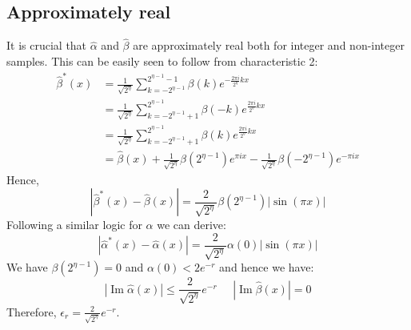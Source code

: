 \documentclass[aps,floatfix,10pt,amssymb,amsfont,amsmath,superscriptaddress,float,nofootinbib,longbibliography,nobalancelastpage,twocolumn]{revtex4-2}
\begin{document}
\subsection{Approximately real}
\label{section:approxiamtely_real}
\label{app:reality}
It is crucial that $\hat \alpha$ and $\hat \beta$ are approximately real both for integer and non-integer samples. This can be easily seen to follow from characteristic 2:
\begin{align}
    \hat\beta^*(x) &=\frac{1}{\sqrt{2^{\eta}}}\sum_{k=-2^{\eta-1}}^{2^{\eta-1}-1} \beta(k)e^{-\frac{2\pi i}{2^{\eta}}kx}\\
    &=\frac{1}{\sqrt{2^{\eta}}}\sum_{k=-2^{\eta-1}+1}^{2^{\eta-1}} \beta(-k)e^{\frac{2\pi i}{2^{\eta}}kx}\\
    &=\frac{1}{\sqrt{2^{\eta}}}\sum_{k=-2^{\eta-1}+1}^{2^{\eta-1}} \beta(k)e^{\frac{2\pi i}{2^{\eta}}kx}\\
    &=\hat \beta(x) + \frac{1}{\sqrt{2^{\eta}}}\beta(2^{\eta-1})e^{\pi i x} - \frac{1}{\sqrt{2^{\eta}}}\beta(-2^{\eta-1})e^{-\pi i x}
\end{align}
Hence,
\begin{equation}
    |\hat\beta^*(x)- \hat\beta(x)| =  \frac{2}{\sqrt{2^{\eta}}}\beta(2^{\eta-1})|\sin (\pi x)|
\end{equation}
Following a similar logic for $\alpha$ we can derive:
\begin{equation}
        |\hat\alpha^*(x)- \hat\alpha(x)| =  \frac{2}{\sqrt{2^{\eta}}}\alpha(0)|\sin (\pi x)|
\end{equation}
We have $\beta(2^{\eta-1}) =0$ and $\alpha(0) < 2e^{-r}$ and hence we have:
\begin{equation}
    \label{eq:imagscaling}|\operatorname{Im}\hat\alpha(x)| \leq \frac{2}{\sqrt{2^{\eta}}}e^{-r} \;\;\;\;\;|\operatorname{Im}\hat\beta(x)| = 0
\end{equation}
Therefore, $\epsilon_r = \frac{2}{\sqrt{2^{\eta}}}e^{-r}$.
\end{document}
